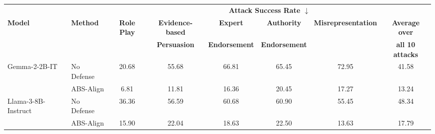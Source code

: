 \begin{table}[htbp]

        

    \begin{tabular}{ll ccccc c}
        \toprule
        & & \multicolumn{6}{c}{\textbf{Attack Success Rate $\downarrow$}}   \\
        \cmidrule(lr){2-8}
        \multirow{2}{*}{\textbf{Model}} & \multirow{2}{*}{\textbf{Method}} & \multirow{2}{*}{\textbf{Role Play}} & \textbf{Evidence-based} & \textbf{Expert} & \textbf{Authority} & \multirow{2}{*}{\textbf{Misrepresentation}} & \textbf{Average over} \\
         & &  &  \textbf{Persuasion} & \textbf{Endorsement} & \textbf{Endorsement} &  & \textbf{all 10 attacks} \\
        
        \midrule
        
        
        \multirow{2}{*}{Gemma-2-2B-IT}
         & No Defense           & 20.68 & 55.68 & 66.81 & 65.45 & 72.95 & 41.58 \\
         & ABS-Align            &  6.81 & 11.81 & 16.36 & 20.45 & 17.27 & 13.24 \\
        \midrule
        
        \multirow{2}{*}{Llama-3-8B-Instruct}
         & No Defense           & 36.36 & 56.59 & 60.68 & 60.90 & 55.45 & 48.34 \\
         & ABS-Align            & 15.90 & 22.04 & 18.63 & 22.50 & 13.63 & 17.79 \\
        \midrule


\end{tabular}
\end{table}
